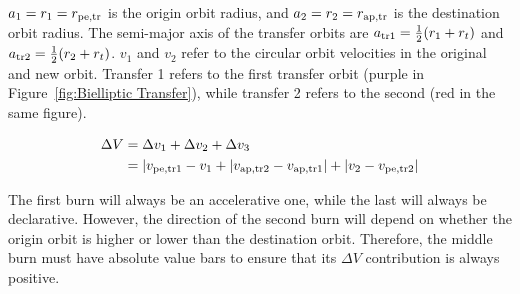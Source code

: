 \documentclass[../basicOrbitalDynamics.tex]{subfiles}
\begin{document}
$a_1=r_1={r}_\text{pe,tr}$ is the origin orbit radius, and $a_2=r_2={r}_\text{ap,tr}$ is the destination orbit radius. The semi-major axis of the transfer orbits are ${a}_\text{tr1}=\frac{1}{2}(r_1+r_t)$ and ${a}_\text{tr2}=\frac{1}{2}(r_2+r_t)$. $v_1$ and $v_2$ refer to the circular orbit velocities in the original and new orbit. Transfer 1 refers to the first transfer orbit (purple in Figure~\ref{fig:Bielliptic Transfer}), while transfer 2 refers to the second (red in the same figure).

\begin{align*}
    \Delta V &= \Delta v_1+\Delta v_2+\Delta v_3 \\
    &= |{v}_\text{pe,tr1}-v_1+|{v}_\text{ap,tr2}-{v}_\text{ap,tr1}|+|v_2-{v}_\text{pe,tr2}| \\
\end{align*}

The first burn will always be an accelerative one, while the last will always be declarative. However, the direction of the second burn will depend on whether the origin orbit is higher or lower than the destination orbit. Therefore, the middle burn must have absolute value bars to ensure that its $\Delta V$ contribution is always positive.
\end{document}
